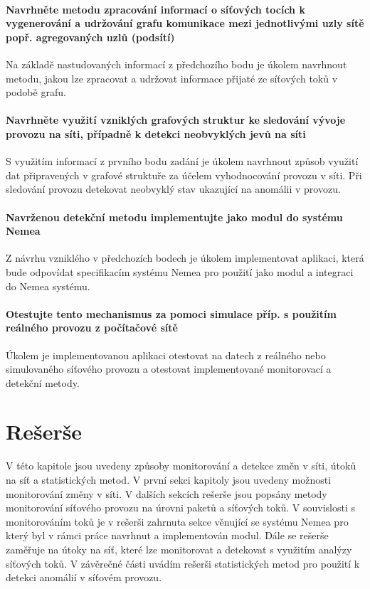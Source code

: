 \documentclass[thesis=M,czech]{FITthesis}[2012/06/26]
\begin{document}
\subsubsection*{Navrhněte metodu zpracování informací o síťových tocích k vygenerování a udržování grafu komunikace mezi jednotlivými uzly sítě popř. agregovaných uzlů (podsítí)}
Na základě nastudovaných informací z předchozího bodu je úkolem navrhnout metodu, jakou lze zpracovat a udržovat informace přijaté ze síťových toků v podobě grafu.
\subsubsection*{Navrhněte využití vzniklých grafových struktur ke sledování vývoje provozu na síti, případně k detekci	neobvyklých jevů na síti}
S využitím informací z prvního bodu zadání je úkolem navrhnout způsob využití dat připravených v grafové struktuře za účelem vyhodnocování provozu v síti. Při sledování provozu detekovat neobvyklý stav ukazující na anomálii v provozu. 

\subsubsection*{Navrženou detekční metodu implementujte jako modul do systému Nemea}
Z návrhu vzniklého v předchozích bodech je úkolem implementovat aplikaci, která bude odpovídat specifikacím systému Nemea pro použití jako modul a integraci do Nemea systému.
\subsubsection*{Otestujte tento mechanismus za pomoci simulace příp. s použitím reálného provozu z počítačové sítě}
Úkolem je implementovanou aplikaci otestovat na datech z reálného nebo simulovaného síťového provozu a otestovat implementované monitorovací a detekční metody. 

\chapter{Rešerše}
V této kapitole jsou uvedeny způsoby monitorování a detekce změn v síti, útoků na síť a statistických metod. V první sekci kapitoly jsou uvedeny možnosti monitorování změny v síti. V dalších sekcích rešerše jsou popsány metody monitorování síťového provozu na úrovni paketů a síťových toků. V souvislosti s monitorováním toků je v rešerši zahrnuta sekce věnující se systému Nemea pro který byl v rámci práce navrhnut a implementován modul. Dále se rešerše zaměřuje na útoky na síť, které lze monitorovat a detekovat s využitím analýzy síťových toků. V závěrečné části uvádím rešerši statistických metod pro použití k detekci anomálií v síťovém provozu.
\end{document}
